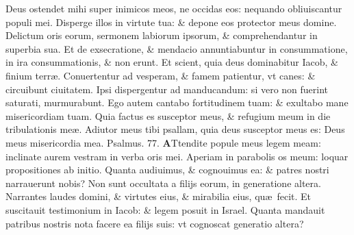 \documentclass[a5paper,10pt]{book}
\def\ae{æ}
\begin{document}
\begin{multicols*}{2}
\newline \color{red} D\color{black}eus ostendet mihi super inimicos meos, ne occidas eos: nequando obliuiscantur populi mei.
\newline \color{red} D\color{black}isperge illos in virtute tua: \& depone eos protector meus domine.
\newline \color{red} D\color{black}elictum oris eorum, sermonem labiorum ipsorum, \& comprehendantur in superbia sua.
\newline \color{red} E\color{black}t de exsecratione, \& mendacio annuntiabuntur in consummatione, in ira consummationis, \& non erunt.
\newline \color{red} E\color{black}t scient, quia deus dominabitur Iacob, \& finium terr\ae .
\newline \color{red} C\color{black}onuertentur ad vesperam, \& famem patientur, vt canes: \& circuibunt ciuitatem.
\newline \color{red} I\color{black}psi dispergentur ad manducandum: si vero non fuerint saturati, murmurabunt.%
\newline \color{red} E\color{black}go autem cantabo fortitudinem tuam: \& exultabo mane misericordiam tuam.
\newline \color{red} Q\color{black}uia factus es susceptor meus, \& refugium meum in die tribulationis me\ae .
\newline \color{red} A\color{black}diutor meus tibi psallam, quia deus susceptor meus es: Deus meus misericordia mea. \quad \color{red} Psalmus. 77. \color{black}
\vspace{-.5em}
\lettrine[lines=2]{\bfseries \color{red} A}{}Ttendite popule meus legem meam: inclinate aurem vestram in verba oris mei.
\newline \color{red} A\color{black}periam in parabolis os meum: loquar propositiones ab initio.
\newline \color{red} Q\color{black}uanta audiuimus, \& cognouimus ea: \& patres nostri narrauerunt nobis?
\newline \color{red} N\color{black}on sunt occultata a filijs eorum, in generatione altera.
\newline \color{red} N\color{black}arrantes laudes domini, \& virtutes eius, \& mirabilia eius, qu\ae \ fecit.
\newline \color{red} E\color{black}t suscitauit testimonium in Iacob: \& legem posuit in Israel.
\newline \color{red} Q\color{black}uanta mandauit patribus nostris nota facere ea filijs suis: vt cognoscat generatio altera?

\end{multicols*}
\end{document}
